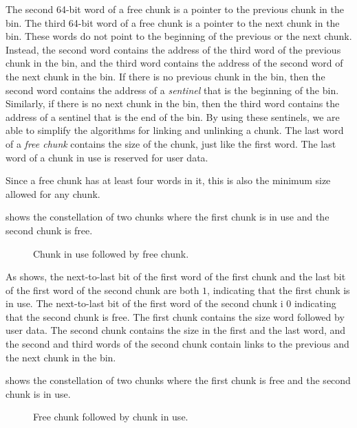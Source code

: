 The second 64-bit word of a free chunk is a pointer to the previous
chunk in the bin.  The third 64-bit word of a free chunk is a pointer
to the next chunk in the bin.  These words do not point to the
beginning of the previous or the next chunk.  Instead, the second word
contains the address of the third word of the previous chunk in the
bin, and the third word contains the address of the second word of the
next chunk in the bin.  If there is no previous chunk in the bin, then
the second word contains the address of a \emph{sentinel} that is the
beginning of the bin.  Similarly, if there is no next chunk in the
bin, then the third word contains the address of a sentinel that is
the end of the bin.  By using these sentinels, we are able to simplify
the algorithms for linking and unlinking a chunk.  The last word of a
\emph{free chunk} contains the size of the chunk, just like the first
word.  The last word of a chunk in use is reserved for user data.

Since a free chunk has at least four words in it, this is also the
minimum size allowed for any chunk.

 shows the constellation of two chunks where the
first chunk is in use and the second chunk is free.

\begin{figure}
\begin{center}
\end{center}
\caption{\label{fig-chunks2}
Chunk in use followed by free chunk.}
\end{figure}

As  shows, the next-to-last bit of the first word
of the first chunk and the last bit of the first word of the second
chunk are both $1$, indicating that the first chunk is in use.  The
next-to-last bit of the first word of the second chunk i $0$
indicating that the second chunk is free.  The first chunk contains
the size word followed by user data.  The second chunk contains the
size in the first and the last word, and the second and third words of
the second chunk contain links to the previous and the next chunk in
the bin.

 shows the constellation of two chunks where the
first chunk is free and the second chunk is in use.

\begin{figure}
\begin{center}
\end{center}
\caption{\label{fig-chunks3}
Free chunk followed by chunk in use.}
\end{figure}

